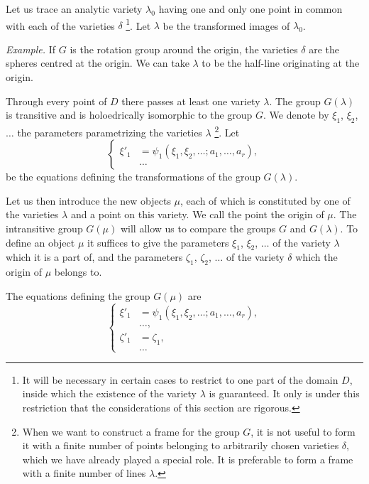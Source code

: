 \documentclass[leqno,11pt]{book}
\numberwithin{equation}{chapter}
\theoremstyle{shape1}
\theoremstyle{shapesmall}
\newcommand{\somespace}{\vspace{9pt}}
\begin{document}
Let us trace an analytic variety $\lambda_{0}$ having one and only one point in common with each of the varieties $\delta$ \footnote{It will be necessary in certain cases to restrict to one part of the domain $D$, inside which the existence of the variety $\lambda$ is guaranteed. It only is under this restriction that the considerations of this section are rigorous.}. Let $\lambda$ be the transformed images of $\lambda_{0}$.

\somespace

{\small
\emph{Example.} If $G$ is the rotation group around the origin, the varieties $\delta$ are the spheres centred at the origin. We can take $\lambda$ to be the half-line originating at the origin.
}

\somespace

Through every point of $D$ there passes at least one variety $\lambda$. The group $G(\lambda)$ is transitive and is holoedrically isomorphic to the group $G$. We denote by $\xi_{1}$, $\xi_{2}$, $\dots$ the parameters parametrizing the varieties $\lambda$ \footnote{When we want to construct a frame for the group $G$, it is not useful to form it with a finite number of points belonging to arbitrarily chosen varieties $\delta$, which we have already played a special role. It is preferable to form a frame with a finite number of lines $\lambda$.}. Let
\begin{equation}
  \label{eq:7.9}
  \left\{
    \begin{aligned}
      \xi'_{1}&=\psi_{1}(\xi_{1},\xi_{2},\dots;a_{1},\dots,a_{r}),\\
      &\dots
    \end{aligned}
  \right.
\end{equation}
be the equations defining the transformations of the group $G(\lambda)$.

Let us then introduce the new objects $\mu$, each of which is constituted by one of the varieties $\lambda$ and a point on this variety. We call the point the origin of $\mu$. The intransitive group $G(\mu)$ will allow us to compare the groups $G$ and $G(\lambda)$. To define an object $\mu$ it suffices to give the parameters $\xi_{1}$, $\xi_{2}$, $\dots$ of the variety $\lambda$ which it is a part of, and the parameters $\zeta_{1}$, $\zeta_{2}$, $\dots$ of the variety $\delta$ which the origin of $\mu$ belongs to.

The equations defining the group $G(\mu)$ are
\begin{equation}
  \label{eq:7.10}
  \left\{
    \begin{aligned}
      \xi'_{1}&=\psi_{1}(\xi_{1},\xi_{2},\dots;a_{1},\dots,a_{r}),\\
      &\dots,\\
      \zeta'_{1}&=\zeta_{1},\\
      &\dots
    \end{aligned}
  \right.
\end{equation}
\end{document}
